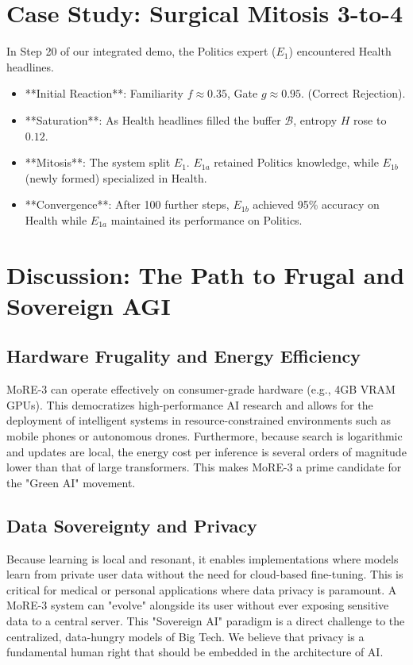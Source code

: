 \documentclass[11pt,hidelinks]{article}
\begin{document}
\section{Case Study: Surgical Mitosis 3-to-4}
In Step 20 of our integrated demo, the Politics expert ($E_1$) encountered Health headlines.
\begin{itemize}
    \item **Initial Reaction**: Familiarity $f \approx 0.35$, Gate $g \approx 0.95$. (Correct Rejection).
    \item **Saturation**: As Health headlines filled the buffer $\mathcal{B}$, entropy $H$ rose to $0.12$.
    \item **Mitosis**: The system split $E_1$. $E_{1a}$ retained Politics knowledge, while $E_{1b}$ (newly formed) specialized in Health.
    \item **Convergence**: After 100 further steps, $E_{1b}$ achieved 95\% accuracy on Health while $E_{1a}$ maintained its performance on Politics.
\end{itemize}

\section{Discussion: The Path to Frugal and Sovereign AGI}
\subsection{Hardware Frugality and Energy Efficiency}
MoRE-3 can operate effectively on consumer-grade hardware (e.g., 4GB VRAM GPUs). This democratizes high-performance AI research and allows for the deployment of intelligent systems in resource-constrained environments such as mobile phones or autonomous drones. Furthermore, because search is logarithmic and updates are local, the energy cost per inference is several orders of magnitude lower than that of large transformers. This makes MoRE-3 a prime candidate for the "Green AI" movement.

\subsection{Data Sovereignty and Privacy}
Because learning is local and resonant, it enables implementations where models learn from private user data without the need for cloud-based fine-tuning. This is critical for medical or personal applications where data privacy is paramount. A MoRE-3 system can "evolve" alongside its user without ever exposing sensitive data to a central server. This "Sovereign AI" paradigm is a direct challenge to the centralized, data-hungry models of Big Tech. We believe that privacy is a fundamental human right that should be embedded in the architecture of AI.
\end{document}
